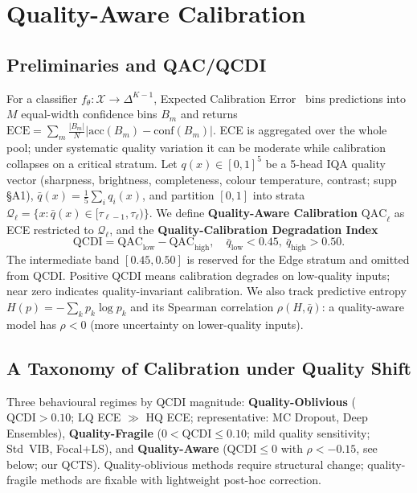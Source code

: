 \documentclass{bmvc2k}
\newcommand{\qbar}{\bar{q}}
\newcommand{\Q}{\mathcal{Q}}
\begin{document}
\section{Quality-Aware Calibration}
\label{sec:qac}

\subsection{Preliminaries and QAC/QCDI}

For a classifier $f_\theta:\mathcal{X}\to\Delta^{K-1}$, Expected Calibration Error~\cite{guo2017calibration} bins predictions into $M$ equal-width confidence bins $B_m$ and returns $\mathrm{ECE}=\sum_m\frac{|B_m|}{N}|\mathrm{acc}(B_m){-}\mathrm{conf}(B_m)|$. ECE is aggregated over the whole pool; under systematic quality variation it can be moderate while calibration collapses on a critical stratum. Let $q(x)\in[0,1]^5$ be a 5-head IQA quality vector (sharpness, brightness, completeness, colour temperature, contrast; supp \S A1), $\qbar(x){=}\tfrac{1}{5}\sum_i q_i(x)$, and partition $[0,1]$ into strata $\Q_\ell{=}\{x:\qbar(x)\in[\tau_{\ell-1},\tau_\ell)\}$. We define \textbf{Quality-Aware Calibration} $\mathrm{QAC}_\ell$ as ECE restricted to $\Q_\ell$, and the \textbf{Quality-Calibration Degradation Index}
\begin{equation}
\mathrm{QCDI} = \mathrm{QAC}_\text{low} - \mathrm{QAC}_\text{high},\quad \qbar_\text{low}{<}0.45,\ \qbar_\text{high}{>}0.50.
\label{eq:qcdi}
\end{equation}
The intermediate band $[0.45,0.50]$ is reserved for the Edge stratum and omitted from QCDI. Positive QCDI means calibration degrades on low-quality inputs; near zero indicates quality-invariant calibration. We also track predictive entropy $H(p){=}{-}\sum_k p_k\log p_k$ and its Spearman correlation $\rho(H,\qbar)$: a quality-aware model has $\rho{<}0$ (more uncertainty on lower-quality inputs).

\subsection{A Taxonomy of Calibration under Quality Shift}
\label{sec:taxonomy}

Three behavioural regimes by QCDI magnitude: \textbf{Quality-Oblivious} ($\mathrm{QCDI}{>}0.10$; LQ ECE $\gg$ HQ ECE; representative: MC Dropout, Deep Ensembles), \textbf{Quality-Fragile} ($0{<}\mathrm{QCDI}{\le}0.10$; mild quality sensitivity; Std~VIB, Focal+LS), and \textbf{Quality-Aware} ($\mathrm{QCDI}{\le}0$ with $\rho{<}-0.15$, see below; our QCTS). Quality-oblivious methods require structural change; quality-fragile methods are fixable with lightweight post-hoc correction.
\end{document}
